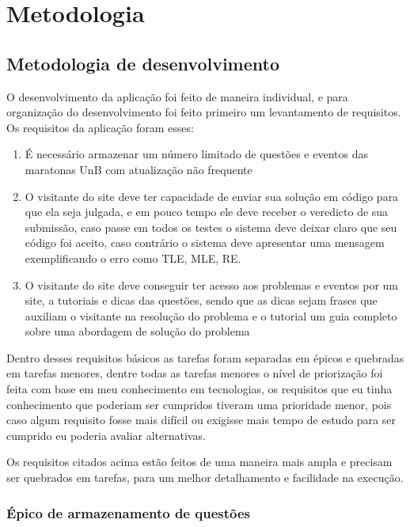 \chapter[Metodologia]{Metodologia}

\section{Metodologia de desenvolvimento}

O desenvolvimento da aplicação foi feito de maneira individual, e para organização do 
desenvolvimento foi feito primeiro um levantamento de requisitos. Os requisitos da aplicação foram 
esses:
\begin{enumerate}

    \item É necessário armazenar um número limitado de questões e eventos das maratonas UnB com 
    atualização não frequente
    \item O visitante do site deve ter capacidade de enviar sua solução em código para que ela seja 
    julgada, e em pouco tempo ele deve receber o veredicto de sua submissão, caso passe em todos os 
    testes o sistema deve deixar claro que seu código foi aceito, caso contrário o sistema deve 
    apresentar uma mensagem exemplificando o erro como TLE, MLE, RE.
    \item O visitante do site deve conseguir ter acesso aos problemas e eventos por um site, a 
    tutoriais e dicas das questões, sendo que as dicas sejam frases que auxiliam o visitante na 
    resolução do problema e o tutorial um guia completo sobre uma abordagem de solução do problema
\end{enumerate}

Dentro desses requisitos básicos as tarefas foram separadas em épicos e quebradas em tarefas 
menores, dentre todas as tarefas menores o nível de priorização foi feita com base em meu 
conhecimento em tecnologias, os requisitos que eu tinha conhecimento que poderiam ser cumpridos 
tiveram uma prioridade menor, pois caso algum requisito fosse mais difícil ou exigisse mais tempo 
de estudo para ser cumprido eu poderia avaliar alternativas.

Os requisitos citados acima estão feitos de uma maneira mais ampla e precisam ser quebrados em 
tarefas, para um melhor detalhamento e facilidade na execução.

\subsection{Épico de armazenamento de questões}

